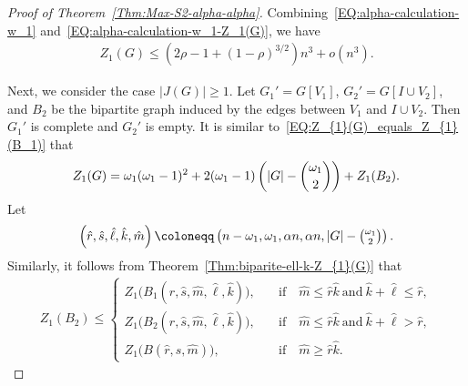 \documentclass[11pt,a4paper]{article}
\begin{document}
\begin{proof}[Proof of Theorem~\ref{Thm:Max-S2-alpha-alpha}]
Combining~\eqref{EQ:alpha-calculation-w_1} and~\eqref{EQ:alpha-calculation-w_1-Z_1(G)}, we have  
\begin{align*}
Z_{1}(G) \le \left(2\rho -1 +(1-\rho)^{3/2}\right)n^3 + o(n^3). 
\end{align*}

Next, we consider the case $|J(G)| \ge 1$. 
Let $G_1'= G[V_1]$, $G_2'=G[I\cup V_2]$, and  $B_2$ be the bipartite graph induced by the edges between $V_1$ and $I \cup V_2$. 
Then $G_1'$ is complete and $G_2'$ is empty. 
It is similar to~\eqref{EQ:Z_{1}(G)_equals_Z_{1}(B_1)} that 
\begin{align}\label{EQ:Z_{1}(G)-B2-omega1}
Z_{1}(G) = \omega_1 (\omega_1 -1)^2 + 2(\omega_1 -1) \left(|G| - \binom{\omega_1}{2}\right) + Z_{1}(B_2). 
\end{align}
Let 
\begin{align*}
\left(\hat{r},\hat{s},\hat{\ell},\hat{k},\hat{m}\right) 
\coloneqq \left(n- \omega_1, \omega_1, \alpha n, \alpha n, |G|- \tbinom{\omega_1}{2}\right). 
\end{align*}
Similarly, it follows from Theorem~\ref{Thm:biparite-ell-k-Z_{1}(G)} that 
\begin{align}\label{EQ:alpha-Z_1-B_2-from_bi}
 Z_{1}(B_2)
        \le 
        \begin{cases}
            Z_{1}\big(B_1(\hat{r},\hat{s},\hat{m},\hat{\ell},\hat{k}) \big), &\quad\text{if}\quad \hat{m} \le \hat{r}\hat{k} ~\text{and}~ \hat{k} + \hat{\ell} \le \hat{r}, \\[0.5em]
            Z_{1}\big(B_2(\hat{r},\hat{s},\hat{m},\hat{\ell},\hat{k}) \big), &\quad\text{if}\quad \hat{m} \le \hat{r}\hat{k} ~\text{and}~ \hat{k} + \hat{\ell} > \hat{r}, \\[0.5em]
            Z_{1}\big(B(\hat{r},\hat{s},\hat{m}) \big), &\quad\text{if}\quad \hat{m} \ge \hat{r} \hat{k}. 
        \end{cases}
\end{align}


\end{proof}
\end{document}
